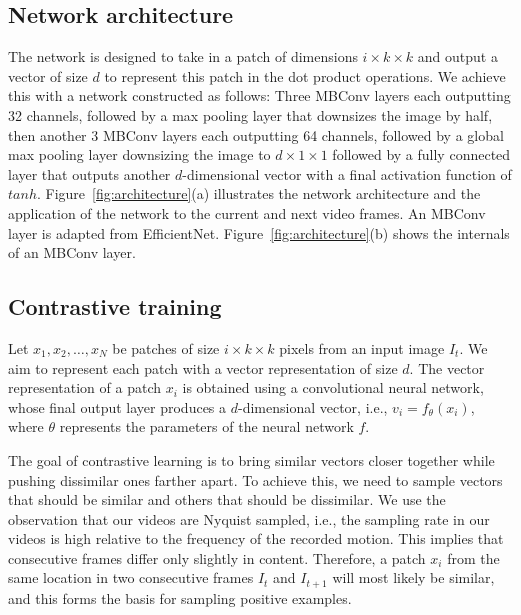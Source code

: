 \documentclass[./dissertation.tex]{subfiles}
\begin{document}
\subsection{Network architecture}
The network is designed to take in a patch of dimensions \(i \times k \times k\) and output a vector of size \(d\) to represent this patch in the dot product operations. We achieve this with a network constructed as follows: Three MBConv layers each outputting 32 channels, followed by a max pooling layer that downsizes the image by half, then another 3 MBConv layers each outputting 64 channels, followed by a global max pooling layer downsizing the image to \( d \times 1 \times 1\) followed by a fully connected layer that outputs another \(d\)-dimensional vector with a final activation function of \(tanh\). Figure~\ref{fig:architecture}(a) illustrates the network architecture and the application of the network to the current and next video frames. An MBConv layer is adapted from EfficientNet\cite{tan2019efficientnet}. Figure~\ref{fig:architecture}(b) shows the internals of an MBConv layer. \\


\subsection{Contrastive training}

Let \(x_1, x_2, \ldots, x_N\) be patches of size \(i \times k \times k\) pixels from an input image \(I_t\). We aim to represent each patch with a vector representation of size \(d\). The vector representation of a patch \(x_i\) is obtained using a convolutional neural network, whose final output layer produces a \(d\)-dimensional vector, i.e., \(v_i = f_\theta(x_i)\), where \(\theta\) represents the parameters of the neural network \(f\).

The goal of contrastive learning is to bring similar vectors closer together while pushing dissimilar ones farther apart. To achieve this, we need to sample vectors that should be similar and others that should be dissimilar. We use the observation that our videos are Nyquist sampled, i.e., the sampling rate in our videos is high relative to the frequency of the recorded motion. This implies that consecutive frames differ only slightly in content. Therefore, a patch \(x_i\) from the same location in two consecutive frames \(I_t\) and \(I_{t+1}\) will most likely be similar, and this forms the basis for sampling positive examples.
\end{document}
